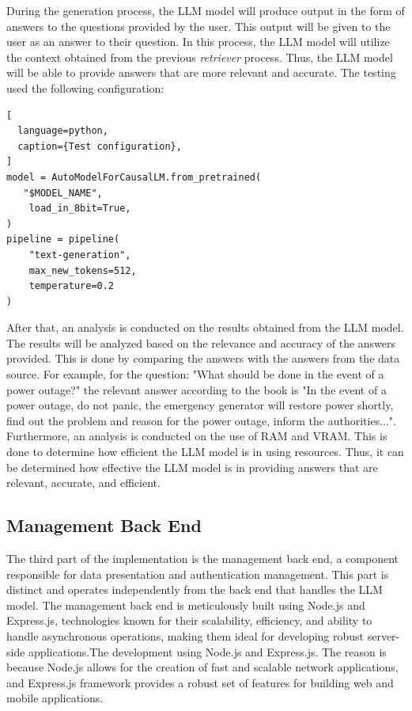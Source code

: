 During the generation process, the LLM model will produce output in the form of answers to the questions provided by the user. This output will be given to the user as an answer to their question. In this process, the LLM model will utilize the context obtained from the previous \emph{retriever} process. Thus, the LLM model will be able to provide answers that are more relevant and accurate. The testing used the following configuration:
\begin{lstlisting}[
  language=python,
  caption={Test configuration},
]
model = AutoModelForCausalLM.from_pretrained(
   "$MODEL_NAME",
    load_in_8bit=True,
)
pipeline = pipeline(
    "text-generation",
    max_new_tokens=512,
    temperature=0.2
)
\end{lstlisting}

After that, an analysis is conducted on the results obtained from the LLM model. The results will be analyzed based on the relevance and accuracy of the answers provided. This is done by comparing the answers with the answers from the data source. For example, for the question: "What should be done in the event of a power outage?" the relevant answer according to the book is "In the event of a power outage, do not panic, the emergency generator will restore power shortly, find out the problem and reason for the power outage, inform the authorities...". Furthermore, an analysis is conducted on the use of RAM and VRAM. This is done to determine how efficient the LLM model is in using resources. Thus, it can be determined how effective the LLM model is in providing answers that are relevant, accurate, and efficient.

\subsection{Management Back End}
\label{subsec:managebackend}
The third part of the implementation is the management back end, a component responsible for data presentation and authentication management. This part is distinct and operates independently from the back end that handles the LLM  model. The management back end is meticulously built using Node.js and Express.js, technologies known for their scalability, efficiency, and ability to handle asynchronous operations, making them ideal for developing robust server-side applications.The development using Node.js and Express.js. The reason is because Node.js allows for the creation of fast and scalable network applications, and  Express.js framework provides a robust set of features for building web and mobile applications.

